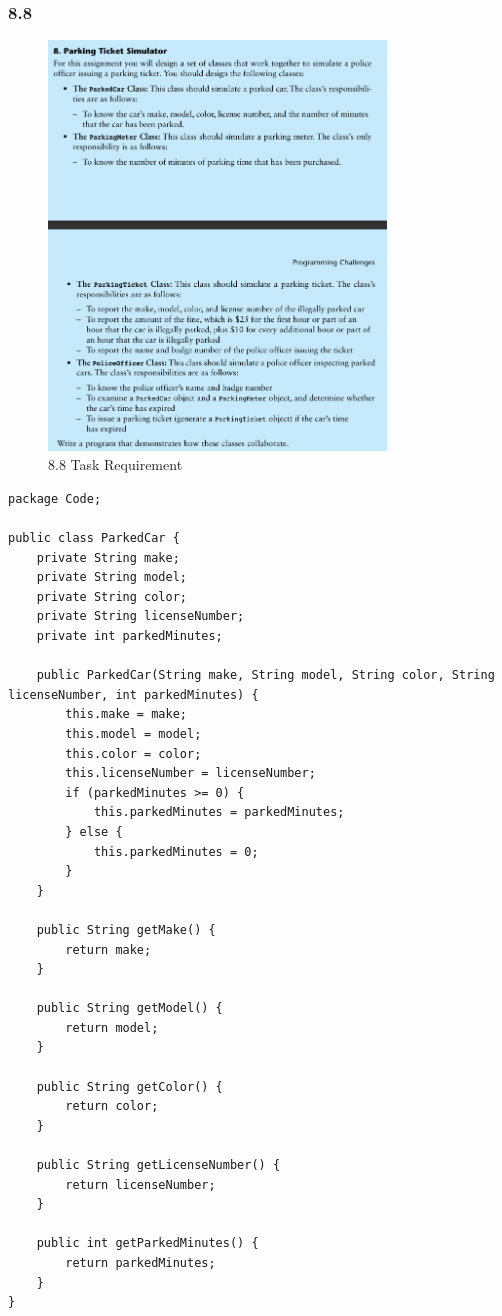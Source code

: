 \documentclass{article}
\begin{document}
\subsubsection*{8.8}

\begin{figure}[H]
    \centering
    \includegraphics[width=0.8\textwidth]{./Assets/Task requirements/Assignment12/8.8.png}
    \caption{8.8 Task Requirement}
\end{figure}

\begin{lstlisting}[caption=ParkedCar.java]
package Code;

public class ParkedCar {
    private String make;
    private String model;
    private String color;
    private String licenseNumber;
    private int parkedMinutes;

    public ParkedCar(String make, String model, String color, String licenseNumber, int parkedMinutes) {
        this.make = make;
        this.model = model;
        this.color = color;
        this.licenseNumber = licenseNumber;
        if (parkedMinutes >= 0) {
            this.parkedMinutes = parkedMinutes;
        } else {
            this.parkedMinutes = 0;
        }
    }

    public String getMake() {
        return make;
    }

    public String getModel() {
        return model;
    }

    public String getColor() {
        return color;
    }

    public String getLicenseNumber() {
        return licenseNumber;
    }

    public int getParkedMinutes() {
        return parkedMinutes;
    }
}
\end{lstlisting}
\end{document}
